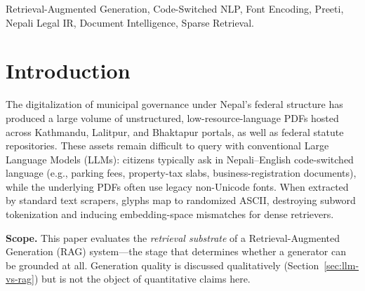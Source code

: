 \documentclass[journal]{IEEEtran}
\begin{document}
\begin{IEEEkeywords}
Retrieval-Augmented Generation, Code-Switched NLP, Font Encoding, Preeti, Nepali Legal IR, Document Intelligence, Sparse Retrieval.
\end{IEEEkeywords}

\section{Introduction}
The digitalization of municipal governance under Nepal's federal structure has produced a large volume of unstructured, low-resource-language PDFs hosted across Kathmandu, Lalitpur, and Bhaktapur portals, as well as federal statute repositories. These assets remain difficult to query with conventional Large Language Models (LLMs): citizens typically ask in Nepali--English code-switched language (e.g., parking fees, property-tax slabs, business-registration documents), while the underlying PDFs often use legacy non-Unicode fonts. When extracted by standard text scrapers, glyphs map to randomized ASCII, destroying subword tokenization and inducing embedding-space mismatches for dense retrievers.

\textbf{Scope.} This paper evaluates the \emph{retrieval substrate} of a Retrieval-Augmented Generation (RAG) system---the stage that determines whether a generator can be grounded at all. Generation quality is discussed qualitatively (Section~\ref{sec:llm-vs-rag}) but is not the object of quantitative claims here.
\end{document}
